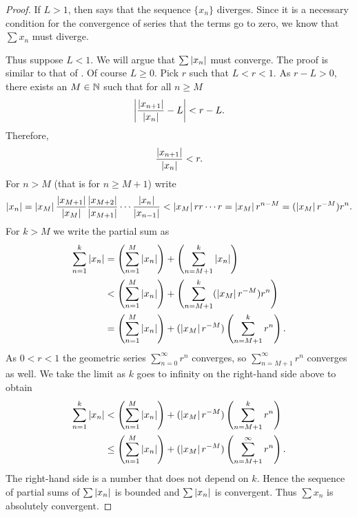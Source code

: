 \begin{proof}
If $L > 1$, then
 says that the sequence $\{ x_n \}$
diverges.  Since it is a necessary condition for the convergence of series
that the terms go to zero, we know that $\sum x_n$ must diverge.

Thus suppose $L < 1$.
We will argue that $\sum \left\lvert {x_n} \right\rvert$ must converge.
The proof is similar to that of .  Of course $L \geq
0$.  
Pick
$r$ such that $L < r < 1$.  As $r-L > 0$, there exists an $M \in {\mathbb{N}}$ such that for
all $n \geq M$
\begin{equation*}
\left\lvert {\frac{\left\lvert {x_{n+1}} \right\rvert}{\left\lvert {x_n} \right\rvert} - L} \right\rvert < r-L .
\end{equation*}
Therefore,
\begin{equation*}
\frac{\left\lvert {x_{n+1}} \right\rvert}{\left\lvert {x_n} \right\rvert} < r .
\end{equation*}
For $n > M$ (that is for $n \geq M+1$)
write
\begin{equation*}
\left\lvert {x_n} \right\rvert =
\left\lvert {x_M} \right\rvert
\frac{\left\lvert {x_{M+1}} \right\rvert}{\left\lvert {x_{M}} \right\rvert}
\frac{\left\lvert {x_{M+2}} \right\rvert}{\left\lvert {x_{M+1}} \right\rvert}
\cdots
\frac{\left\lvert {x_{n}} \right\rvert}{\left\lvert {x_{n-1}} \right\rvert}
<
\left\lvert {x_M} \right\rvert
r r \cdots r = \left\lvert {x_M} \right\rvert r^{n-M} = (\left\lvert {x_M} \right\rvert r^{-M}) r^n .
\end{equation*}
For $k > M$ we write the partial sum as
\begin{equation*}
\begin{split}
\sum_{n=1}^k \left\lvert {x_n} \right\rvert
& =
\left(\sum_{n=1}^{M} \left\lvert {x_n} \right\rvert \right)
+
\left(\sum_{n=M+1}^{k} \left\lvert {x_n} \right\rvert \right)
\\
& <
\left(\sum_{n=1}^{M} \left\lvert {x_n} \right\rvert \right)
+
\left(\sum_{n=M+1}^{k} 
(\left\lvert {x_M} \right\rvert r^{-M}) r^n
\right)
\\
& =
\left(\sum_{n=1}^{M} \left\lvert {x_n} \right\rvert \right)
+
(\left\lvert {x_M} \right\rvert r^{-M})
\left( \sum_{n=M+1}^{k} r^n \right) .
\end{split}
\end{equation*}
As $0 < r < 1$ the geometric series
$\sum_{n=0}^{\infty} r^n$ converges, so
$\sum_{n=M+1}^{\infty} r^n$ converges as well.  We take the
limit as $k$ goes to infinity on the right-hand side above to obtain
\begin{equation*}
\begin{split}
\sum_{n=1}^k \left\lvert {x_n} \right\rvert
& <
\left(\sum_{n=1}^{M} \left\lvert {x_n} \right\rvert \right)
+
(\left\lvert {x_M} \right\rvert r^{-M})
\left( \sum_{n=M+1}^{k} r^n \right) 
\\
& \leq
\left(\sum_{n=1}^{M} \left\lvert {x_n} \right\rvert \right)
+
(\left\lvert {x_M} \right\rvert r^{-M})
\left( \sum_{n=M+1}^{\infty} r^n \right) .
\end{split}
\end{equation*}
The right-hand side is a number that does not depend on $k$.
Hence the sequence of partial sums of $\sum \left\lvert {x_n} \right\rvert$ is bounded
and $\sum \left\lvert {x_n} \right\rvert$ is convergent.  Thus $\sum x_n$ is
absolutely convergent.
\end{proof}

